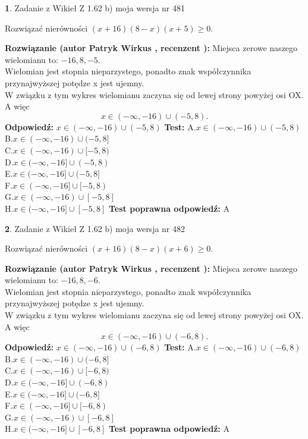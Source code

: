 \documentclass[12pt, a4paper]{article}
\theoremstyle{definition} %
\newtheorem{zad}{}
\newcommand{\zadStart}[1]{\begin{zad}#1\newline}
\newcommand{\zadStop}{\end{zad}}
\newcommand{\rozwStart}[2]{\noindent \textbf{Rozwiązanie (autor #1 , recenzent #2): }\newline}
\newcommand{\rozwStop}{\newline}
\newcommand{\odpStart}{\noindent \textbf{Odpowiedź:}\newline}
\newcommand{\odpStop}{\newline}
\newcommand{\testStart}{\noindent \textbf{Test:}\newline}
\newcommand{\testStop}{\newline}
\newcommand{\kluczStart}{\noindent \textbf{Test poprawna odpowiedź:}\newline}
\newcommand{\kluczStop}{\newline}
\begin{document}
\zadStart{Zadanie z Wikieł Z 1.62 b) moja wersja nr 481}

Rozwiązać nierówności $(x+16)(8-x)(x+5)\ge0$.
\zadStop
\rozwStart{Patryk Wirkus}{}
Miejsca zerowe naszego wielomianu to: $-16, 8, -5$.\\
Wielomian jest stopnia nieparzystego, ponadto znak współczynnika przy\linebreak najwyższej potędze x jest ujemny.\\ W związku z tym wykres wielomianu zaczyna się od lewej strony powyżej osi OX. A więc $$x \in (-\infty,-16) \cup (-5,8).$$
\rozwStop
\odpStart
$x \in (-\infty,-16) \cup (-5,8)$
\odpStop
\testStart
A.$x \in (-\infty,-16) \cup (-5,8)$\\
B.$x \in (-\infty,-16) \cup (-5,8]$\\
C.$x \in (-\infty,-16) \cup [-5,8)$\\
D.$x \in (-\infty,-16] \cup (-5,8)$\\
E.$x \in (-\infty,-16] \cup (-5,8]$\\
F.$x \in (-\infty,-16] \cup [-5,8)$\\
G.$x \in (-\infty,-16) \cup [-5,8]$\\
H.$x \in (-\infty,-16] \cup [-5,8]$
\testStop
\kluczStart
A
\kluczStop



\zadStart{Zadanie z Wikieł Z 1.62 b) moja wersja nr 482}

Rozwiązać nierówności $(x+16)(8-x)(x+6)\ge0$.
\zadStop
\rozwStart{Patryk Wirkus}{}
Miejsca zerowe naszego wielomianu to: $-16, 8, -6$.\\
Wielomian jest stopnia nieparzystego, ponadto znak współczynnika przy\linebreak najwyższej potędze x jest ujemny.\\ W związku z tym wykres wielomianu zaczyna się od lewej strony powyżej osi OX. A więc $$x \in (-\infty,-16) \cup (-6,8).$$
\rozwStop
\odpStart
$x \in (-\infty,-16) \cup (-6,8)$
\odpStop
\testStart
A.$x \in (-\infty,-16) \cup (-6,8)$\\
B.$x \in (-\infty,-16) \cup (-6,8]$\\
C.$x \in (-\infty,-16) \cup [-6,8)$\\
D.$x \in (-\infty,-16] \cup (-6,8)$\\
E.$x \in (-\infty,-16] \cup (-6,8]$\\
F.$x \in (-\infty,-16] \cup [-6,8)$\\
G.$x \in (-\infty,-16) \cup [-6,8]$\\
H.$x \in (-\infty,-16] \cup [-6,8]$
\testStop
\kluczStart
A
\kluczStop
\end{document}
